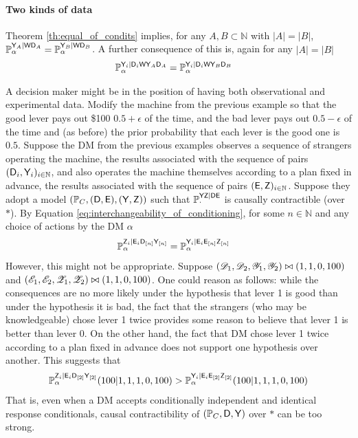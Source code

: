 \paragraph{Two kinds of data}\label{pgph:two_kinds}

Theorem \ref{th:equal_of_condits} implies, for any $A,B\subset\mathbb{N}$ with $|A|=|B|$, $\mathbb{P}_\alpha^{\mathsf{Y}_A|\mathsf{WD}_A}=\mathbb{P}_\alpha^{\mathsf{Y}_B|\mathsf{WD}_B}$. A further consequence of this is, again for any $|A|=|B|$
\begin{align}
    \mathbb{P}_\alpha^{\mathsf{Y}_i|\mathsf{D}_i\mathsf{W}\mathsf{Y}_A\mathsf{D}_A} &= \mathbb{P}_\alpha^{\mathsf{Y}_i|\mathsf{D}_i\mathsf{W}\mathsf{Y}_B\mathsf{D}_B}\label{eq:interchangeability_of_conditioning}
\end{align}

A decision maker might be in the position of having both observational and experimental data. Modify the machine from the previous example so that the good lever pays out \$100 $0.5+\epsilon$ of the time, and the bad lever pays out $0.5-\epsilon$ of the time and (as before) the prior probability that each lever is the good one is $0.5$. Suppose the DM from the previous examples observes a sequence of strangers operating the machine, the results associated with the sequence of pairs $(\mathsf{D}_i,\mathsf{Y}_i)_{i\in\mathbb{N}}$, and also operates the machine themselves according to a plan fixed in advance, the results associated with the sequence of pairs $(\mathsf{E},\mathsf{Z})_{i\in \mathbb{N}}$. Suppose they adopt a model $(\mathbb{P}_C,(\mathsf{D},\mathsf{E}),(\mathsf{Y},\mathsf{Z}))$ such that $\mathbb{P}_\cdot^{\mathsf{YZ}|\mathsf{DE}}$ is causally contractible (over $*$). By Equation \ref{eq:interchangeability_of_conditioning}, for some $n\in\mathbb{N}$ and any choice of actions by the DM $\alpha$
\begin{align}
    \mathbb{P}_\alpha^{\mathsf{Z}_i|\mathsf{E}_i\mathsf{D}_{[n]}\mathsf{Y}_{[n]}} &= \mathbb{P}_\alpha^{\mathsf{Y}_i|\mathsf{E}_i\mathsf{E}_{[n]}\mathsf{Z}_{[n]}}
\end{align}
However, this might not be appropriate. Suppose $(\mathscr{D}_1,\mathscr{D}_2,\mathscr{Y}_1,\mathscr{Y}_2)\bowtie (1,1,0,100)$ and $(\mathscr{E}_1,\mathscr{E}_2,\mathscr{Z}_1,\mathscr{Z}_2)\bowtie (1,1,0,100)$. One could reason as follows: while the consequences are no more likely under the hypothesis that lever 1 is good than under the hypothesis it is bad, the fact that the strangers (who may be knowledgeable) chose lever 1 twice provides some reason to believe that lever 1 is better than lever 0. On the other hand, the fact that DM chose lever 1 twice according to a plan fixed in advance does not support one hypothesis over another. This suggests that
\begin{align}
    \mathbb{P}_\alpha^{\mathsf{Z}_i|\mathsf{E}_i\mathsf{D}_{[2]}\mathsf{Y}_{[2]}}(100|1,1,1,0,100) > \mathbb{P}_\alpha^{\mathsf{Y}_i|\mathsf{E}_i\mathsf{E}_{[2]}\mathsf{Z}_{[2]}}(100|1,1,1,0,100)
\end{align}
That is, even when a DM accepts conditionally independent and identical response conditionals, causal contractibility of $(\mathbb{P}_C,\mathsf{D},\mathsf{Y})$ over $*$ can be too strong.

